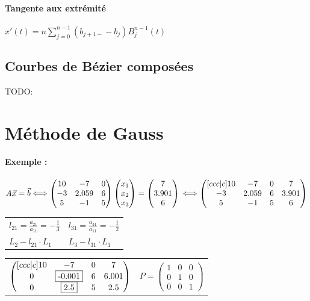 \documentclass[a4paper,9pt]{extarticle}
\begin{document}
\begin{multicols*}{2}
\paragraph*{Tangente aux extrémité} $x'(t) = n \sum_{j=0}^{n-1}(b_{j+1-}-b_j)B_j^{n-1}(t)$
\subsection{Courbes de Bézier composées}
TODO:
\section{Méthode de Gauss}
\paragraph*{Exemple : }
$
A \vec{x} = \vec{b} \Longleftrightarrow
\begin{pmatrix}
 10 & -7 & 0       \\
 -3 & 2.059 &   6     \\
 5 &  -1 &   5     
\end{pmatrix}
\begin{pmatrix}
 x_1    \\
 x_2    \\
 x_3     
\end{pmatrix}
=
\begin{pmatrix}
 7  \\
 3.901    \\
 6     
\end{pmatrix}
\\
\Longleftrightarrow
\begin{pmatrix}[ccc|c]
 10 & -7 & 0   & 7    \\
 -3 & 2.059 &   6  & 3.901  \\
 5 &  -1 &   5 & 6  
\end{pmatrix}
$

\begin{tabular}{ll}
$l_{21} = \frac{a_{21}}{a_{11}} = - \frac{1}{3}$ & $l_{31} = \frac{a_{31}}{a_{11}} = - \frac{1}{2}$ \\
$L_2 - l_{21} \cdot L_1$ & $L_3 - l_{31} \cdot L_1$
\end{tabular}

\begin{tabular}{ll}
$
\begin{pmatrix}[ccc|c]
 10 & -7 & 0   & 7    \\
 0 & \fbox{-0.001} &   6  & 6.001  \\
 0 &  \fbox{2.5} &   5 & 2.5  
\end{pmatrix}
$
&
$
P=
\begin{pmatrix}
 1 & 0 & 0       \\
 0 & 1 & 0     \\
 0 & 0 & 1     
\end{pmatrix}
$
\end{tabular}


\end{multicols*}
\end{document}
